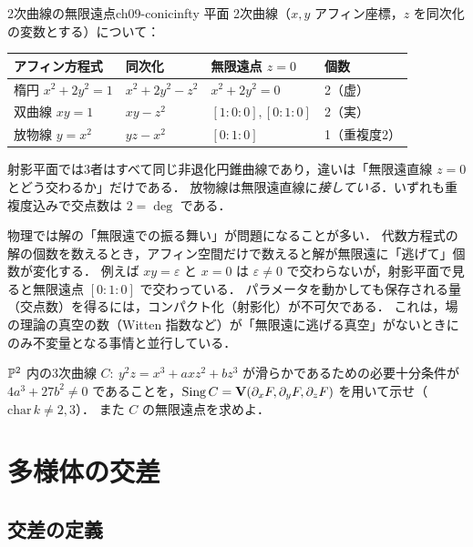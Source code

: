 \begin{myex}{2次曲線の無限遠点}{ch09-conicinfty}
平面 2次曲線（$x,y$ アフィン座標，$z$ を同次化の変数とする）について：
\begin{center}
\renewcommand{\arraystretch}{1.3}
\begin{tabular}{llll}
\hline
アフィン方程式 & 同次化 & 無限遠点 $z=0$ & 個数 \\
\hline
楕円 $x^2+2y^2=1$ & $x^2+2y^2-z^2$ & $x^2+2y^2=0$ & 2（虚） \\
双曲線 $xy=1$ & $xy-z^2$ & $[1:0:0],[0:1:0]$ & 2（実） \\
放物線 $y=x^2$ & $yz-x^2$ & $[0:1:0]$ & 1（重複度2） \\
\hline
\end{tabular}
\end{center}
射影平面では3者はすべて同じ非退化円錐曲線であり，違いは「無限遠直線 $z=0$ とどう交わるか」だけである．
放物線は無限遠直線に\emph{接している}．いずれも重複度込みで交点数は $2=\deg$ である．
\end{myex}

\begin{physbox}[境界条件としての無限遠点]
物理では解の「無限遠での振る舞い」が問題になることが多い．
代数方程式の解の個数を数えるとき，アフィン空間だけで数えると解が無限遠に「逃げて」個数が変化する．
例えば $xy=\varepsilon$ と $x=0$ は $\varepsilon\neq0$ で交わらないが，射影平面で見ると無限遠点 $[0:1:0]$ で交わっている．
パラメータを動かしても保存される量（交点数）を得るには，コンパクト化（射影化）が不可欠である．
これは，場の理論の真空の数（Witten 指数など）が「無限遠に逃げる真空」がないときにのみ不変量となる事情と並行している．
\end{physbox}

$\mathbb{P}^2$ 内の3次曲線 $C:\ y^2z=x^3+axz^2+bz^3$ が滑らかであるための必要十分条件が $4a^3+27b^2\neq0$ であることを，$\operatorname{Sing} C=\mathbf{V}(\partial_xF,\partial_yF,\partial_zF)$ を用いて示せ（$\mathrm{char}\,k\neq2,3$）．
また $C$ の無限遠点を求めよ．

\section{多様体の交差}

\subsection{交差の定義}

